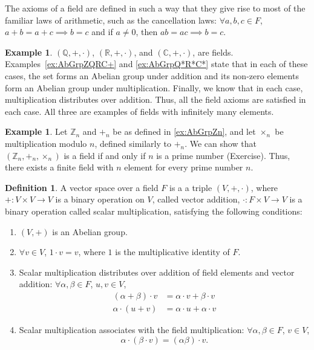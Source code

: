\documentclass[svgnames]{article}
\theoremstyle{definition}
\newtheorem{Definition}[Theorem]{Definition}
\newtheorem{Example}[Theorem]{Example}
\theoremstyle{remark}
\newcommand{\newterm}[1]{{\color{alertcolor} #1}}
\begin{document}
The axioms of a field are defined in such a way that they give rise to most of the familiar laws of arithmetic, such as the cancellation laws: $\forall a, b, c \in F$, $a + b = a + c \implies b = c$ and if $a \ne 0$, then $ab = ac  \implies b = c$.

\begin{Example}\label{ex:FldQRC}
$(\mathbb Q, +, \cdot)$, $(\mathbb R, +, \cdot)$, and $(\mathbb C, +, \cdot)$, are fields. Examples~\ref{ex:AbGrpZQRC+} and \ref{ex:AbGrpQ*R*C*} state that in each of these cases, the set forms an Abelian group under addition and its non-zero elements form an Abelian group under multiplication. Finally, we know that in each case, multiplication distributes over addition. Thus, all the field axioms are satisfied in each case. All three are examples of fields with infinitely many elements.
\end{Example}
\begin{Example}
Let $\mathbb Z_n$ and $+_n$ be as defined in \cref{ex:AbGrpZn}, and let $\times_n$ be multiplication modulo $n$, defined similarly to $+_n$. We can show that $(\mathbb Z_n, +_n, \times _n)$ is a field if and only if $n$ is a prime number {(Exercise)}. Thus, there exists a finite field with $n$ element for every prime number $n$.
\end{Example}

\begin{Definition}\label{def:VecSpace}
A \newterm{vector space over a field} $F$ is a a triple $(V, +, \cdot)$, where $+ \colon V \times V \to V$ is a binary operation on $V$, called \newterm{vector addition}, $\cdot \colon F \times V \to V$ is a binary operation called \newterm{scalar multiplication}, satisfying the following conditions:
\begin{enumerate}
\item\label{it:VS1} $(V, +)$ is an Abelian group.
\item\label{it:VS2} $\forall v \in V$, $1 \cdot v = v$, where $1$ is the multiplicative identity of $F$.
\item\label{it:VS3} Scalar multiplication distributes over addition of field elements and vector addition: $\forall \alpha, \beta \in F$, $u, v \in V$,
	\begin{align*}
	(\alpha + \beta) \cdot v & = \alpha \cdot v + \beta \cdot v\\
	\alpha \cdot (u + v) & = \alpha \cdot u + \alpha \cdot v
	\end{align*}
\item\label{it:VS4} Scalar multiplication associates with the field multiplication: $\forall \alpha, \beta \in F$, $v \in V$,
	\begin{equation*}
	\alpha \cdot (\beta \cdot v) = (\alpha\beta) \cdot v.
	\end{equation*}
\end{enumerate}
\end{Definition}
\end{document}
